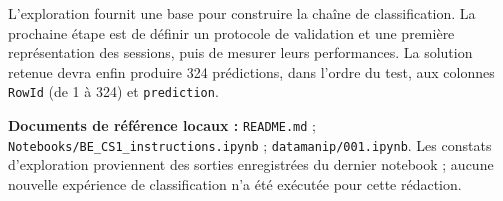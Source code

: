 \documentclass[10pt,a4paper]{article}
\begin{document}
L'exploration fournit une base pour construire la chaîne de classification.
La prochaine étape est de définir un protocole de validation et une première
représentation des sessions, puis de mesurer leurs performances. La
solution retenue devra enfin produire 324 prédictions, dans l'ordre du
test, aux colonnes \texttt{RowId} (de 1 à 324) et \texttt{prediction}.

\vfill
{\footnotesize\textbf{Documents de référence locaux :}
\texttt{README.md} ; \texttt{Notebooks/BE\_CS1\_instructions.ipynb} ;
\texttt{datamanip/001.ipynb}. Les constats d'exploration proviennent des
sorties enregistrées du dernier notebook ; aucune nouvelle expérience
de classification n'a été exécutée pour cette rédaction.}
\end{document}

